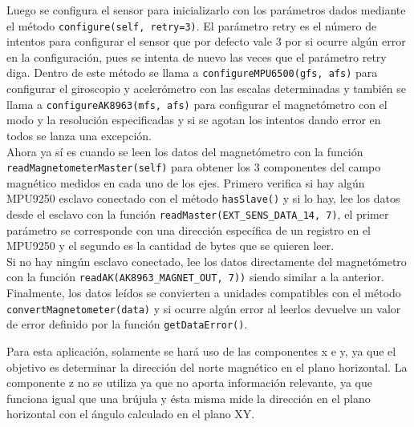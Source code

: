 Luego se configura el sensor para inicializarlo con los parámetros dados mediante el método \verb|configure(self, retry=3)|. El parámetro retry es el número de intentos para configurar el sensor que por defecto vale 3 por si ocurre algún error en la configuración, pues se intenta de nuevo las veces que el parámetro retry diga. Dentro de este método se llama a \verb|configureMPU6500(gfs, afs)| para configurar el giroscopio y acelerómetro con las escalas determinadas y también se llama a \verb|configureAK8963(mfs, afs)| para configurar el magnetómetro con el modo y la resolución especificadas y si se agotan los intentos dando error en todos se lanza una excepción.\\

Ahora ya sí es cuando se leen los datos del magnetómetro con la función \verb|readMagnetometerMaster(self)| para obtener los 3 componentes del campo magnético medidos en cada uno de los ejes. Primero verifica si hay algún MPU9250 esclavo conectado con el método \verb|hasSlave()| y si lo hay, lee los datos desde el esclavo con la función \verb|readMaster(EXT_SENS_DATA_14, 7)|, el primer parámetro se corresponde con una dirección específica de un registro en el MPU9250 y el segundo es la cantidad de bytes que se quieren leer. \\ Si no hay ningún esclavo conectado, lee los datos directamente del magnetómetro con la función \verb|readAK(AK8963_MAGNET_OUT, 7))| siendo similar a la anterior. Finalmente, los datos leídos se convierten a unidades compatibles con el método \verb|convertMagnetometer(data)| y si ocurre algún error al leerlos devuelve un valor de error definido por la función \verb|getDataError()|.

Para esta aplicación, solamente se hará uso de las componentes x e y, ya que el objetivo es determinar la dirección del norte magnético en el plano horizontal. La componente z no se utiliza ya que no aporta información relevante, ya que funciona igual que una brújula y ésta misma mide la dirección en el plano horizontal con el ángulo calculado en el plano XY.\\





